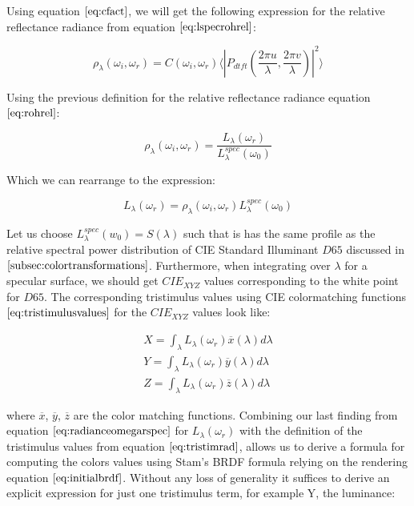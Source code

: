 Using equation $\ref{eq:cfact}$, we will get the following expression for the relative reflectance radiance from equation $\ref{eq:lspecrohrel}$:

\begin{equation}
\rho_\lambda(\omega_i,\omega_r) =  C(\omega_i,\omega_r) \langle \left|P_{dtft}(\frac{2\pi u}{\lambda}, \frac{2\pi v}{\lambda})\right|^2\rangle
\label{eq:cpterm}
\end{equation}

Using the previous definition for the relative reflectance radiance equation $\ref{eq:rohrel}$:

\begin{equation}
 \rho_\lambda(\omega_i,\omega_r) = \frac{L_\lambda(\omega_r)}{L_\lambda^{spec}(\omega_0)} 
\end{equation}

Which we can rearrange to the expression: 

\begin{equation}
L_\lambda(\omega_r) = \rho_\lambda(\omega_i,\omega_r)L_\lambda^{spec}(\omega_0)
\label{eq:radianceomegarspec}
\end{equation}

Let us choose $L_\lambda^{spec}(w_0) = S(\lambda)$ such that is has the same profile as the relative spectral power distribution of CIE Standard Illuminant $D65$ discussed in $\ref{subsec:colortransformations}$. Furthermore, when integrating over $\lambda$ for a specular surface, we should get $CIE_{XYZ}$ values corresponding to the white point for $D65$. The corresponding tristimulus values using CIE colormatching functions $\ref{eq:tristimulusvalues}$ for the $CIE_{XYZ}$ values look like:

\begin{align}
X = \int_{\lambda}L_\lambda(\omega_r)\overline{x}(\lambda)d\lambda \nonumber \\
Y = \int_{\lambda}L_\lambda(\omega_r)\overline{y}(\lambda)d\lambda \nonumber \\
Z = \int_{\lambda}L_\lambda(\omega_r)\overline{z}(\lambda)d\lambda
\label{eq:tristimrad}
\end{align}

where $\overline{x}$, $\overline{y}$, $\overline{z}$ are the color matching functions. Combining our last finding from equation $\ref{eq:radianceomegarspec}$ for $L_\lambda(\omega_r)$ with the definition of the tristimulus values from equation $\ref{eq:tristimrad}$, allows us to 
derive a formula for computing the colors values using Stam's BRDF formula relying on the rendering equation $\ref{eq:initialbrdf}$. Without any loss of generality it suffices to derive an explicit expression for just one tristimulus term, for example Y, the luminance:

